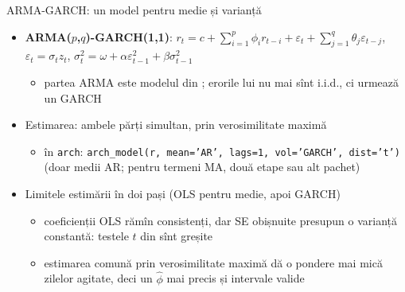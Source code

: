 \begin{frame}{ARMA-GARCH: un model pentru medie și varianță}
\itemsize{\small}
\begin{itemize}
    \item \textbf{ARMA($p$,$q$)-GARCH(1,1)}: $r_t = c + \sum_{i=1}^{p}\phi_i r_{t-i} + \varepsilon_t + \sum_{j=1}^{q}\theta_j\varepsilon_{t-j}$, \quad $\varepsilon_t = \sigma_t z_t$, \quad $\sigma_t^2 = \omega + \alpha\varepsilon_{t-1}^2 + \beta\sigma_{t-1}^2$
    \begin{itemize}
        \item partea ARMA este modelul din ; erorile lui nu mai sînt i.i.d., ci urmează un GARCH
    \end{itemize}
    \item Estimarea: ambele părți simultan, prin verosimilitate maximă
    \begin{itemize}
        \item în \texttt{arch}: \texttt{arch\_model(r, mean='AR', lags=1, vol='GARCH', dist='t')} (doar medii AR; pentru termeni MA, două etape sau alt pachet)
    \end{itemize}
    \item Limitele estimării în doi pași (OLS pentru medie, apoi GARCH)
    \begin{itemize}
        \item coeficienții OLS rămîn consistenți, dar SE obișnuite presupun o varianță constantă: testele $t$ din  sînt greșite
        \item estimarea comună prin verosimilitate maximă dă o pondere mai mică zilelor agitate, deci un $\hat\phi$ mai precis și intervale valide
    \end{itemize}
\end{itemize}
\end{frame}

